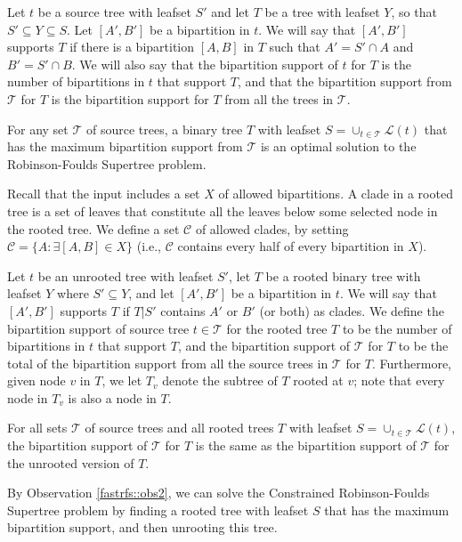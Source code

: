 Let $t$ be a source tree with leafset $S'$ and let $T$ be a 
tree with leafset
$Y$, so that  $S' \subseteq Y \subseteq S$.
Let $[A',B']$ be a bipartition in $t$. We will say that
$[A',B']$ supports $T$ if there is a bipartition $[A,B]$ in $T$
such that $A'=S' \cap A$ and $B' = S' \cap B$.
We will also say that the bipartition support of $t$ for $T$ is
the number of bipartitions in $t$ that support $T$, and that the
bipartition support from $\mathcal{T}$ for $T$ is the 
bipartition support for $T$ from all the trees in $\mathcal{T}$.
\begin{observation}
For any set $\mathcal{T}$ of source trees, a
binary tree $T$ with leafset $S = \cup_{t \in \mathcal{T}} \mathcal{L}(t)$ that
has the
maximum bipartition support from $\mathcal{T}$ is an
optimal solution to  the Robinson-Foulds Supertree problem.
\end{observation}



Recall that the input includes a set $X$
of allowed bipartitions. 
A clade in a rooted tree is a set of leaves that constitute all the leaves below some selected node in the rooted tree.
We define a set   $\mathcal{C}$ of allowed clades, by
setting $\mathcal{C} = \{A: \exists [A,B] \in X\}$
(i.e., $\mathcal{C}$ contains
every half of every bipartition in $X$).

Let $t$ be an unrooted tree with  leafset
$S'$, let $T$ be a rooted
binary tree  with leafset
$Y$ where $S' \subseteq Y$,
and  let $[A',B']$ be a bipartition in $t$.
We will say that $[A',B']$ 
 supports $T$ if $T|S'$ contains
$A'$ or $B'$ (or both) as clades. 
We define the  bipartition support of
source tree $t \in \mathcal{T}$ for the rooted tree $T$ to be the 
number of bipartitions in $t$ that support $T$,
and the  bipartition support of $\mathcal{T}$ for $T$
to be the total of the bipartition support from all 
the source trees in $\mathcal{T}$ for $T$.
Furthermore, given node $v$ in $T$, we let
$T_v$ denote the subtree of $T$ rooted at $v$;
note that every node in $T_v$ is also a node in $T$.

\begin{observation}
\label{fastrfs::obs2}
For all sets $\mathcal{T}$ of source trees and all
rooted trees $T$ with leafset
$S = \cup_{t \in \mathcal{T}} \mathcal{L}(t)$, 
the bipartition support of $\mathcal{T}$
for $T$ 
is the same as the bipartition support of $\mathcal{T}$
for the unrooted version of $T$.
\end{observation}

By Observation \ref{fastrfs::obs2}, we
can solve the Constrained Robinson-Foulds Supertree problem by
finding a rooted tree  with leafset $S$
that has the maximum bipartition support, and then unrooting this tree.

